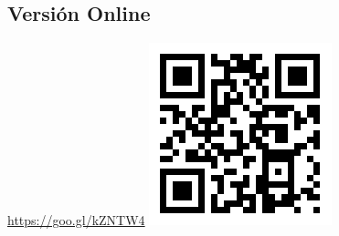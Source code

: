 \documentclass[a4paper,spanish,9pt]{extarticle}
\begin{document}
\begin{multicols*}{2}
\section{Versión Online}

\url{https://goo.gl/kZNTW4} \includegraphics[width=0.15\columnwidth]{qr_chuletapot}





\end{multicols*}
\end{document}
